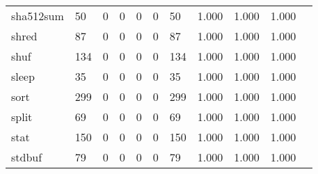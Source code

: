 \begin{longtable}{lp{1.10cm}p{1.10cm}p{1.10cm}p{1.10cm}p{1.10cm}p{1.10cm}p{1.10cm}p{1.10cm}p{1.10cm}p{1.10cm}}
sha512sum &                     50 &                                  0 &                                 0 &                                0 &                                 0 &                              50 &                          1.000 &                                 1.000 &                               1.000 \\
shred     &                     87 &                                  0 &                                 0 &                                0 &                                 0 &                              87 &                          1.000 &                                 1.000 &                               1.000 \\
shuf      &                    134 &                                  0 &                                 0 &                                0 &                                 0 &                             134 &                          1.000 &                                 1.000 &                               1.000 \\
sleep     &                     35 &                                  0 &                                 0 &                                0 &                                 0 &                              35 &                          1.000 &                                 1.000 &                               1.000 \\
sort      &                    299 &                                  0 &                                 0 &                                0 &                                 0 &                             299 &                          1.000 &                                 1.000 &                               1.000 \\
split     &                     69 &                                  0 &                                 0 &                                0 &                                 0 &                              69 &                          1.000 &                                 1.000 &                               1.000 \\
stat      &                    150 &                                  0 &                                 0 &                                0 &                                 0 &                             150 &                          1.000 &                                 1.000 &                               1.000 \\
stdbuf    &                     79 &                                  0 &                                 0 &                                0 &                                 0 &                              79 &                          1.000 &                                 1.000 &                               1.000 \\

\end{longtable}
